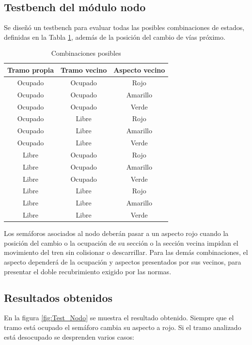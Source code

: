 	\subsection{Testbench del módulo nodo}
			
			Se diseñó un testbench para evaluar todas las posibles combinaciones de estados, definidas en la Tabla \ref{tabla_nodos}, además de la posición del cambio de vías próximo.
					
			\begin{table}[!hbt]
			\renewcommand{\arraystretch}{1.3}
			\caption{Combinaciones posibles}
			\label{tabla_nodos}
			\centering
			\begin{tabular}{ c  c  c }
			\hline
			Tramo propia & Tramo vecino & Aspecto vecino \\	
			\hline
			Ocupado & Ocupado & Rojo  \\
			Ocupado & Ocupado & Amarillo  \\
			Ocupado & Ocupado & Verde  \\	
			Ocupado & Libre & Rojo  \\
			Ocupado & Libre & Amarillo  \\
			Ocupado & Libre & Verde  \\	
			Libre & Ocupado & Rojo  \\
			Libre & Ocupado & Amarillo  \\
			Libre & Ocupado & Verde  \\	
			Libre & Libre & Rojo  \\
			Libre & Libre & Amarillo  \\
			Libre & Libre & Verde  \\	
			\end{tabular}
			\end{table}	
	
		Los semáforos asociados al nodo deberán pasar a un aspecto rojo cuando la posición del cambio o la ocupación de su sección o la sección vecina impidan el movimiento del tren sin colisionar o descarrillar. Para las demás combinaciones, el aspecto dependerá de la ocupación y aspectos presentados por sus vecinos, para presentar el doble recubrimiento exigido por las normas.
			
		\subsection{Resultados obtenidos}
			
			En la figura \ref{fig:Test_Nodo} se muestra el resultado obtenido. Siempre que el tramo está ocupado el semáforo cambia su aspecto a rojo. Si el tramo analizado está desocupado se desprenden varios casos:
			
